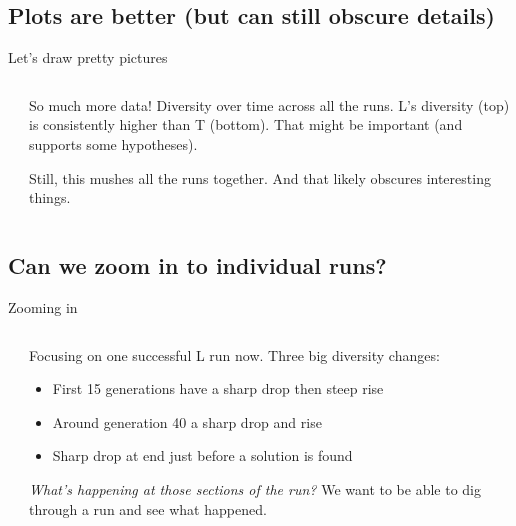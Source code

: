 \documentclass{beamer}
\newcommand{\linespace}{\vskip 0.25cm}
\begin{document}
\subsection{Plots are better (but can still obscure details)}

\begin{frame}{Let's draw pretty pictures}
	
	\begin{columns}
		\begin{column}{0.55 \linewidth}
			\centering
		\end{column}
		
		\begin{column}{0.4 \linewidth}
			\begin{overprint}
				So much more data!
				\linespace
				Diversity over time across all the runs.
				\linespace
				L's diversity (top) is consistently higher than T (bottom).
				\linespace
				That might be important (and supports some hypotheses).
				
				Still, this mushes all the runs together.
				\linespace
				And that likely obscures interesting things.
			\end{overprint}
		\end{column}
	\end{columns}
\end{frame}

\subsection{Can we zoom in to individual runs?}

\begin{frame}{Zooming in}
	
	\begin{columns}
		\begin{column}{0.55 \linewidth}
			\centering
		\end{column}
		
		\begin{column}{0.4 \linewidth}
			\begin{overprint}
				\onslide<1>
				Focusing on one successful L run now.
				\linespace
				Three big diversity changes:
				\begin{itemize}
					\item First 15 generations have a sharp drop then steep rise
					\item Around generation 40 a sharp drop and rise
					\item Sharp drop at end just before a solution is found
				\end{itemize}
				
				\onslide<2>
				\emph{What's happening at those sections of the run?}
				\linespace
				We want to be able to dig through a run and see what happened.
			\end{overprint}
		\end{column}
	\end{columns}
\end{frame}
\end{document}
